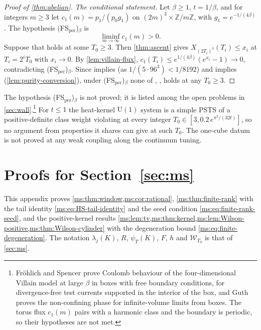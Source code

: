 \documentclass[11pt,a4paper]{amsart}
\theoremstyle{definition}
\theoremstyle{remark}
\numberwithin{equation}{section}
\newcommand{\Z}{\mathbb{Z}}          %
\newcommand{\Wwin}{\mathcal{W}}      %
\newcommand{\U}{\mathrm{U}}                %
\newcommand{\PSTS}{\textup{PSTS}}          %
\newcommand{\TT}{\mathbb{T}}               %
\newcommand{\Zc}{\mathcal{Z}}              %
\newcommand{\XT}[2]{X_{#1}(#2)}            %
\newcommand{\cube}[1]{(2#1)^3}             %
\newcommand{\xconst}{\frac{1}{8192}}       %
\newcommand{\xconstinl}{1/8192}            %
\newcommand{\Mcirc}{\text{\upshape(M$^{\circ}$)}}   %
\newcommand{\Bcirc}{\text{\upshape(B$^{\circ}$)}}   %
\newcommand{\Bstar}{\text{\upshape(B$^{*}$)}}       %
\begin{document}
\begin{proof}[Proof of \cref{thm:abelian}]
\emph{The conditional statement.} Let $\beta\ge1$, $t=1/\beta$, and for integers $m\ge3$ let $c_1(m)=p_1/(p_0g_1)$ on $\cube m\times\Z/m\Z$, with $g_1=e^{-1/(4\beta)}$. The hypothesis \textup{(FS$_{\mathrm{per}}$)}$_\beta$ is
\[
\liminf_{m\to\infty}c_1(m)>0.
\] Suppose that \Bcirc{} holds at some $T_0\ge3$. Then \cref{thm:ascent} gives $\XT{\cube{T_i}}{T_i}\le x_i$ at $T_i=2^iT_0$ with $x_i\to0$. By \cref{lem:villain-flux}, $c_1(T_i)\le e^{1/(4\beta)}(e^{x_i}-1)\to0$, contradicting \textup{(FS$_{\mathrm{per}}$)}$_\beta$. Since \Bstar{} implies \Bcirc{} (as $1/(5\cdot96^3)<\xconstinl$) and \Mcirc{} implies \Bcirc{} (\cref{lem:purity-conversion}), under \textup{(FS$_{\mathrm{per}}$)}$_\beta$ none of \Bcirc{}, \Mcirc{}, \Bstar{} holds at any $T_0\ge3$.
\end{proof}

The hypothesis \textup{(FS$_{\mathrm{per}}$)}$_\beta$ is not proved; it is listed among the open problems in \cref{sec:wall}.\footnote{Fr\"ohlich and Spencer \cite{frohlich1982} prove Coulomb behaviour of the four-dimensional Villain model at large $\beta$ in boxes with free boundary conditions, for divergence-free test currents supported in the interior of the box, and Guth \cite{guth1980} proves the non-confining phase for infinite-volume limits from boxes. The torus flux $c_1(m)$ pairs with a harmonic class and the boundary is periodic, so their hypotheses are not met.} For $t\le1$ the heat-kernel $\U(1)$ system is a simple \PSTS{} of a positive-definite class weight violating \Mcirc{} at every integer $T_0\in[3,0.2\,e^{\pi^2/(32t)}]$, so no argument from properties it shares can give \Mcirc{} at such $T_0$. The one-cube datum \Mcirc{} is not proved at any weak coupling along the continuum tuning.
\section{Proofs for Section~\ref{sec:ms}}\label{app:ms-proofs}

This appendix proves \cref{ms:thm:window,ms:cor:rational}, \cref{ms:thm:finite-rank} with the tail identity \eqref{ms:eq:HS-tail-identity} and the seed condition \eqref{ms:eq:finite-rank-seed}, and the positive-kernel results \cref{ms:lem:tv,ms:thm:kernel,ms:lem:Wilson-positive,ms:thm:Wilson-cylinder} with the degeneration bound \eqref{ms:eq:finite-degeneration}. The notation $\lambda_j(K)$, $R$, $\psi_T(K)$, $F$, $h$ and $\Wwin_{T_0}$ is that of \cref{sec:ms}.
\end{document}
